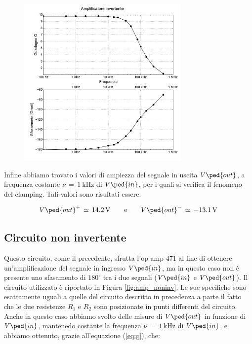 \begin{figure}
    \includegraphics[width=0.75\textwidth]{amp_inv.pdf}
    \label{fig:g_vs_freq}
\end{figure}

Infine abbiamo trovato i valori di ampiezza del segnale in uscita $V\ped{out}$, a frequenza costante $\nu\,=\,\SI{1}{\kilo\hertz}$ di $V\ped{in}$, per i quali si verifica il fenomeno del clamping. Tali valori sono risultati essere:

\begin{equation}
        V\ped{out}^+\,\simeq\,\SI{14.2}{\volt} \qquad \text{e} \qquad V\ped{out}^-\,\simeq\,\SI{-13.1}{\volt}
\end{equation}

\subsection*{Circuito non invertente}

Questo circuito, come il precedente, sfrutta l'op-amp 471 al fine di ottenere un'amplificazione del segnale in ingresso $V\ped{in}$, ma in questo caso non è presente uno sfasamento di $180^\circ$ tra i due segnali ($V\ped{in}$ e $V\ped{out}$).
Il circuito utilizzato è riportato in Figura \ref{fig:amp_noninv}. Le sue specifiche sono esattamente uguali a quelle del circuito descritto in precedenza a parte il fatto che le due resistenze $R_1$ e $R_2$ sono posizionate in punti differenti del circuito.
Anche in questo caso abbiamo svolto delle misure di $V\ped{out}$ in funzione di $V\ped{in}$, mantenedo costante la frequenza $\nu\,=\,\SI{1}{\kilo\hertz}$ di $V\ped{in}$, e abbiamo ottenuto, grazie all'equazione (\ref{eq:g}), che:

